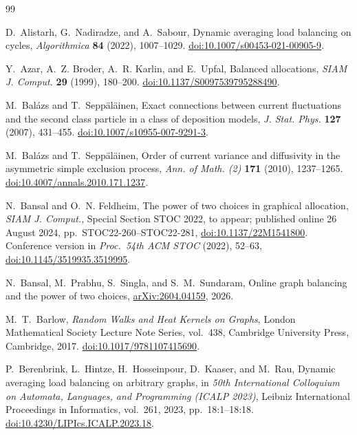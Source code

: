 \documentclass[11pt]{article}
\theoremstyle{remark}
\newcommand{\doi}[1]{\href{https://doi.org/#1}{doi:#1}}
\begin{document}
\begingroup
{}
\begin{thebibliography}{99}
\small

D.~Alistarh, G.~Nadiradze, and A.~Sabour,
\newblock Dynamic averaging load balancing on cycles,
\newblock \emph{Algorithmica} \textbf{84} (2022), 1007--1029.
\newblock \doi{10.1007/s00453-021-00905-9}.

Y.~Azar, A.~Z. Broder, A.~R. Karlin, and E.~Upfal,
\newblock Balanced allocations,
\newblock \emph{SIAM J. Comput.} \textbf{29} (1999), 180--200.
\newblock \doi{10.1137/S0097539795288490}.

M.~Bal\'azs and T.~Sepp\"al\"ainen,
\newblock Exact connections between current fluctuations and the second class particle in a class of deposition models,
\newblock \emph{J. Stat. Phys.} \textbf{127} (2007), 431--455.
\newblock \doi{10.1007/s10955-007-9291-3}.

M.~Bal\'azs and T.~Sepp\"al\"ainen,
\newblock Order of current variance and diffusivity in the asymmetric simple exclusion process,
\newblock \emph{Ann. of Math. (2)} \textbf{171} (2010), 1237--1265.
\newblock \doi{10.4007/annals.2010.171.1237}.

N.~Bansal and O.~N. Feldheim,
\newblock The power of two choices in graphical allocation,
\newblock \emph{SIAM J. Comput.}, Special Section STOC 2022, to appear;
published online 26 August 2024, pp.~STOC22-260--STOC22-281,
\doi{10.1137/22M1541800}.
\newblock Conference version in \emph{Proc.\ 54th ACM STOC} (2022), 52--63,
\doi{10.1145/3519935.3519995}.

N.~Bansal, M.~Prabhu, S.~Singla, and S.~M.~Sundaram,
\newblock Online graph balancing and the power of two choices,
\newblock \href{https://arxiv.org/abs/2604.04159}{arXiv:2604.04159}, 2026.

M.~T.~Barlow,
\newblock \emph{Random Walks and Heat Kernels on Graphs},
\newblock London Mathematical Society Lecture Note Series, vol.~438, Cambridge University Press, Cambridge, 2017.
\newblock \doi{10.1017/9781107415690}.

P.~Berenbrink, L.~Hintze, H.~Hosseinpour, D.~Kaaser, and M.~Rau,
\newblock Dynamic averaging load balancing on arbitrary graphs,
\newblock in \emph{50th International Colloquium on Automata, Languages, and Programming (ICALP 2023)},
Leibniz International Proceedings in Informatics, vol.~261, 2023, pp.~18:1--18:18.
\newblock \doi{10.4230/LIPIcs.ICALP.2023.18}.


\end{thebibliography}
\end{document}
